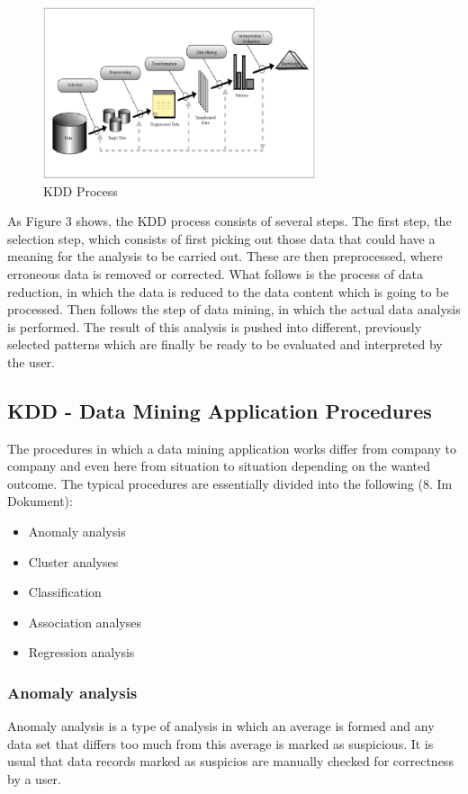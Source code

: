 \documentclass[12pt,twocolumn,twoside]{conference}   %
\begin{document}
\begin{figure}[H]
\centering
\includegraphics[width=8cm]{Abbildungen/KDD.png}
\caption{KDD Process}\label{visina8}
\end{figure}

As Figure 3 shows, the KDD process consists of several steps. The first step, the selection step, which consists of first picking out those data that could have a meaning for the analysis to be carried out. These are then preprocessed, where erroneous data is removed or corrected. What follows is the process of data reduction, in which the data is reduced to the data content which is going to be processed. Then follows the step of data mining, in which the actual data analysis is performed. The result of this analysis is pushed into different, previously selected patterns which are finally be ready to be evaluated and interpreted by the user.


\subsection{KDD - Data Mining Application Procedures}
The procedures in which a data mining application works differ from company to company and even here from situation to situation depending on the wanted outcome. The typical procedures are essentially divided into the following (8. Im Dokument):

\begin{itemize}
\item Anomaly analysis
\item Cluster analyses
\item Classification
\item Association analyses
\item Regression analysis
\end{itemize}

\subsubsection{Anomaly analysis}
Anomaly analysis is a type of analysis in which an average is formed and any data set that differs too much from this average is marked as suspicious. It is usual that data records marked as suspicios are manually checked for correctness by a user.
\end{document}
